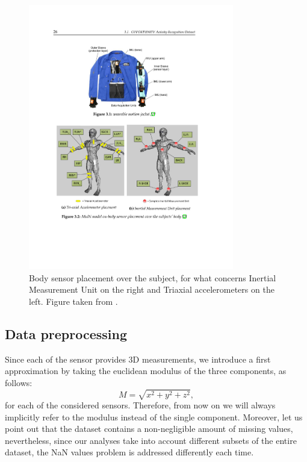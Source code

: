 \documentclass[10pt, a4paper, twocolumn]{article}
\theoremstyle{definition}
\begin{document}
\begin{figure} \centering
         \includegraphics[width=0.8\textwidth]{images/sensors}
    \caption{Body sensor placement over the subject, for what concerns Inertial Measurement Unit on the right and Triaxial accelerometers on the left. Figure taken from \cite{opportunity}.  }\label{fig:sensors}
\end{figure}

\subsection{Data preprocessing}
Since each of the sensor provides 3D measurements, we introduce a first approximation by taking the euclidean modulus of the three components, as follows:
\begin{equation}
M = \sqrt{x^2+y^2+z^2},
\end{equation}
for each of the considered sensors. Therefore, from now on we will always implicitly refer to the modulus instead of the single component. Moreover, let us point out that the dataset contains a non-negligible amount of missing values, nevertheless, since our analyses take into account different subsets of the entire dataset, the NaN values problem is addressed differently each time.
\end{document}
